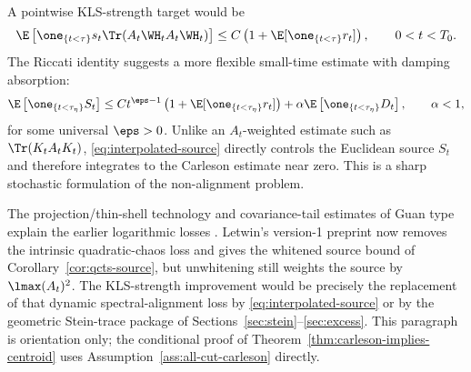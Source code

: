 \documentclass[../../main.tex]{subfiles}
\begin{document}
A pointwise KLS-strength target would be
\begin{equation}\label{eq:pointwise-nonalignment}
  \E\left[\one_{\{t<\tau\}}s_t\Tr(A_t\WH_tA_t\WH_t)\right]
  \le C\left(1+\E[\one_{\{t<\tau\}}r_t]\right),
  \qquad 0<t<T_0 .
\end{equation}
The Riccati identity suggests a more flexible small-time estimate with damping absorption:
\begin{equation}\label{eq:interpolated-source}
  \E\left[\one_{\{t<\tau_\eta\}}S_t\right]
  \le
  C t^{\eps-1}\left(1+\E[\one_{\{t<\tau_\eta\}}r_t]\right)
  +\alpha\E\left[\one_{\{t<\tau_\eta\}}D_t\right],
  \qquad \alpha<1,
\end{equation}
for some universal $\eps>0$. Unlike an $A_t$-weighted estimate such as
$\Tr(K_tA_tK_t)$, \eqref{eq:interpolated-source} directly controls the Euclidean source $S_t$ and
therefore integrates to the Carleson estimate near zero. This is a sharp stochastic formulation of
the non-alignment problem.

\begin{remark}
The projection/thin-shell technology and covariance-tail estimates of Guan type explain the
earlier logarithmic losses \cite{Klartag2023Logarithmic,Guan2025Tail}. Letwin's version-1
preprint now removes the intrinsic quadratic-chaos loss and gives the whitened source bound of
Corollary~\ref{cor:qcts-source}, but unwhitening still weights the source by
$\lmax(A_t)^2$. The KLS-strength improvement would be precisely the replacement of that dynamic
spectral-alignment loss by \eqref{eq:interpolated-source} or by the geometric Stein-trace
package of Sections~\ref{sec:stein}--\ref{sec:excess}. This paragraph is orientation only; the
conditional proof of Theorem~\ref{thm:carleson-implies-centroid} uses
Assumption~\ref{ass:all-cut-carleson} directly.
\end{remark}
\end{document}
